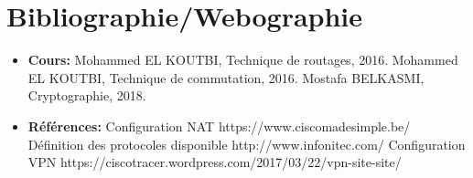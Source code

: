 \documentclass[12pt,a4paper]{report}
\begin{document}





	
	\chapter*{Bibliographie/Webographie}
	
	\vspace{2cm}

	  \begin{itemize}
	 		\item \textbf{Cours: } \newline
	 		[1] Mohammed EL KOUTBI, Technique de routages, 2016. \newline
			[2] Mohammed EL KOUTBI, Technique de commutation, 2016. \newline
			[3] Mostafa BELKASMI, Cryptographie, 2018. \newline
			\item \textbf{Références: } \newline
			[w1] Configuration NAT https://www.ciscomadesimple.be/ \newline
			[w2] Définition des protocoles disponible http://www.infonitec.com/ \newline
			[w3] Configuration VPN https://ciscotracer.wordpress.com/2017/03/22/vpn-site-site/ \newline
		\end{itemize}
	
\end{document}
